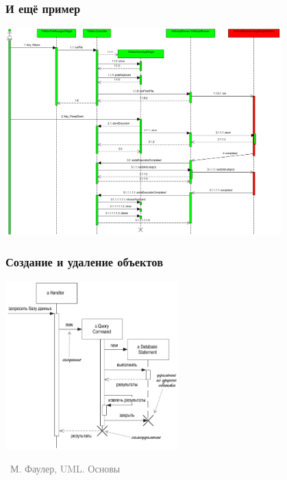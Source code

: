 \documentclass[xetex,mathserif,serif]{beamer}
\newcommand{\attribution}[1] {
	\vspace{-5mm}\begin{flushright}\begin{scriptsize}\textcolor{gray}{\textcopyright\, #1}\end{scriptsize}\end{flushright}
}
\begin{document}
	\begin{frame}
		\frametitle{И ещё пример}
		\begin{center}
			\includegraphics[width=0.8\textwidth]{sequenceDiagramExample3.png}
		\end{center}
	\end{frame}

	\begin{frame}
		\frametitle{Создание и удаление объектов}
		\begin{center}
			\includegraphics[width=0.5\textwidth]{sequenceDiagramCreationAndDeletion.png}
			\attribution{М. Фаулер, UML. Основы}
		\end{center}
	\end{frame}
\end{document}
